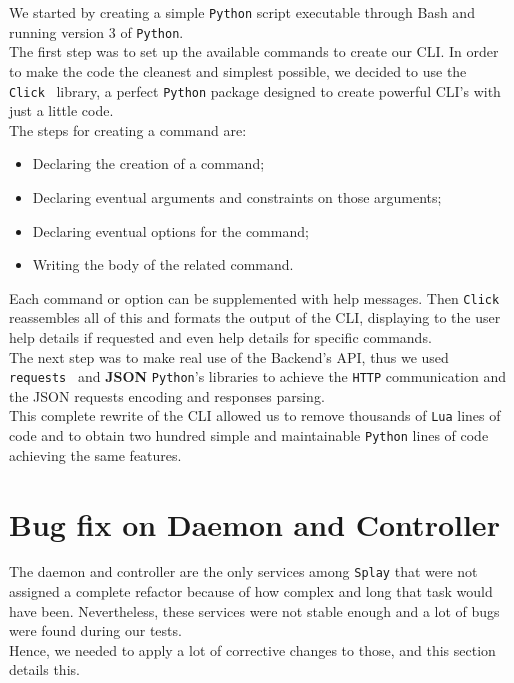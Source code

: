 \documentclass{eplmastersthesis}
\begin{document}
        We started by creating a simple \texttt{Python} script executable
        through Bash and running version 3 of \texttt{Python}.\\

        The first step was to set up the available commands to create our CLI.
        In order to make the code the cleanest and simplest possible, we
        decided to use the \texttt{Click}~\cite{click} library, a perfect
        \texttt{Python} package designed to create powerful CLI's with just a little
        code.\\
        The steps for creating a command are:

        \begin{itemize}
          \item Declaring the creation of a command;
          \item Declaring eventual arguments and constraints on those arguments;
          \item Declaring eventual options for the command;
          \item Writing the body of the related command.
        \end{itemize}

        Each command or option can be supplemented with help messages. Then
        \texttt{Click} reassembles all of this and formats the output of the CLI,
        displaying to the user help details if requested and even help details
        for specific commands.\\

        The next step was to make real use of the Backend's API, thus we used
        \texttt{requests}~\cite{requests} and \textbf{JSON} \texttt{Python}'s libraries to
        achieve the \texttt{HTTP} communication and the JSON requests encoding and
        responses parsing.\\

        This complete rewrite of the CLI allowed us to remove thousands of
        \texttt{Lua} lines of code and to obtain two hundred simple and
        maintainable \texttt{Python} lines of code achieving the same features.

    \section{Bug fix on Daemon and Controller}

      The daemon and controller are the only services
      among \texttt{Splay} that were not assigned a complete refactor because of how
      complex and long that task would have been. Nevertheless, these services
      were not stable enough and a lot of bugs were found during our tests.\\
      Hence, we needed to apply a lot of corrective changes to those, and
      this section details this.
\end{document}
